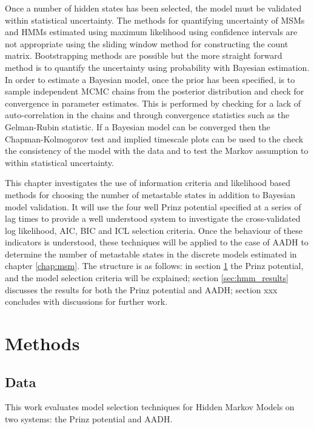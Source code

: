 Once a number of hidden states has been selected, the model must be validated within statistical uncertainty. The methods for quantifying uncertainty of MSMs and HMMs estimated using maximum likelihood using confidence intervals are not appropriate using the sliding window method for constructing the count matrix. Bootstrapping methods are possible but the more straight forward method is to quantify the uncertainty using probability with Bayesian estimation. In order to estimate a Bayesian model, once the prior has been specified, is to sample independent MCMC chains from the posterior distribution and check for convergence in parameter estimates.  This is performed by checking for a lack of auto-correlation in the chains and through convergence statistics such as the Gelman-Rubin statistic. If a Bayesian model can be converged then the Chapman-Kolmogorov test and implied timescale plots can be used to the check the consistency of the model with the data and to test the Markov assumption to within statistical uncertainty. 

This chapter investigates the use of information criteria and likelihood based methods for choosing the number of metastable states in addition to Bayesian model validation. It will use the four well Prinz potential specified at a series of lag times to provide a well understood system to investigate the cross-validated log likelihood, AIC, BIC and ICL selection criteria. Once the behaviour of these indicators is understood, these techniques will be applied to the case of AADH to determine the number of metastable states in the discrete models estimated in  chapter \ref{chap:msm}. The structure is as follows: in section \ref{sec:hmm_methods} the Prinz potential, and the model selection criteria will be explained; section \ref{sec:hmm_results} discusses the results for both the Prinz potential and AADH; section xxx concludes with discussions for further work. 


\section{Methods} \label{sec:hmm_methods}
\subsection{Data}

This work evaluates model selection techniques for Hidden Markov Models on two systems: the Prinz potential and AADH. 


